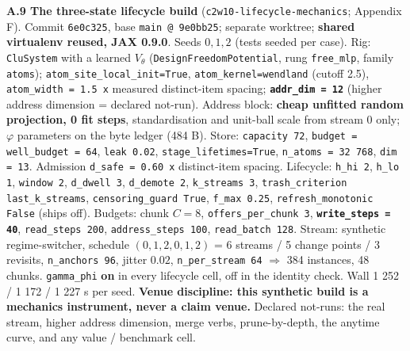 \documentclass{article}
\begin{document}
\textbf{A.9 The three-state lifecycle build} (\texttt{c2w10-lifecycle-mechanics}; Appendix F). Commit \texttt{6e0c325}, base \texttt{main @ 9e0bb25}; separate worktree; \textbf{shared virtualenv reused, JAX 0.9.0}. Seeds $0,1,2$ (tests seeded per case). Rig: \texttt{CluSystem} with a learned $V_\theta$ (\texttt{DesignFreedomPotential}, rung \texttt{free\_mlp}, family \texttt{atoms}); \texttt{atom\_site\_local\_init=True}, \texttt{atom\_kernel=wendland} (cutoff 2.5), \texttt{atom\_width = 1.5 x} measured distinct-item spacing; \textbf{\texttt{addr\_dim = 12}} (higher address dimension = declared not-run). Address block: \textbf{cheap unfitted random projection, 0 fit steps}, standardisation and unit-ball scale from stream 0 only; $\varphi$ parameters on the byte ledger (484 B). Store: \texttt{capacity 72}, \texttt{budget = well\_budget = 64}, \texttt{leak 0.02}, \texttt{stage\_lifetimes=True}, \texttt{n\_atoms = 32 768}, \texttt{dim = 13}. Admission \texttt{d\_safe = 0.60 x} distinct-item spacing. Lifecycle: \texttt{h\_hi 2}, \texttt{h\_lo 1}, \texttt{window 2}, \texttt{d\_dwell 3}, \texttt{d\_demote 2}, \texttt{k\_streams 3}, \texttt{trash\_criterion last\_k\_streams}, \texttt{censoring\_guard True}, \texttt{f\_max 0.25}, \texttt{refresh\_monotonic False} (ships off). Budgets: chunk $C=8$, \texttt{offers\_per\_chunk 3}, \textbf{\texttt{write\_steps = 40}}, \texttt{read\_steps 200}, \texttt{address\_steps 100}, \texttt{read\_batch 128}. Stream: synthetic regime-switcher, schedule $(0,1,2,0,1,2)$ = 6 streams / 5 change points / 3 revisits, \texttt{n\_anchors 96}, jitter $0.02$, \texttt{n\_per\_stream 64} $\Rightarrow$ 384 instances, 48 chunks. \texttt{gamma\_phi} \textbf{on} in every lifecycle cell, off in the identity check. Wall 1 252 / 1 172 / 1 227 s per seed. \textbf{Venue discipline: this synthetic build is a mechanics instrument, never a claim venue.} Declared not-runs: the real stream, higher address dimension, merge verbs, prune-by-depth, the anytime curve, and any value / benchmark cell.
\end{document}
